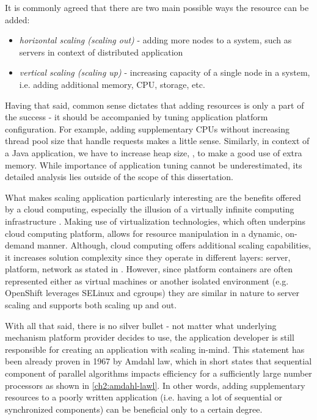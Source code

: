 It is commonly agreed that there are two main possible ways the resource can be added:
\begin{itemize}
	\item \textit{horizontal scaling (scaling out)} - adding more nodes to a system, such as servers in context of distributed application
	\item \textit{vertical scaling (scaling up)} - increasing capacity of a single node in a system, i.e. adding additional memory, CPU, storage, etc.
\end{itemize}

Having that said, common sense dictates that adding resources is only a part of the success - it should be accompanied by tuning application platform configuration. For example, adding supplementary CPUs without increasing thread pool size that handle requests makes a little sense. Similarly, in context of a Java application, we have to increase heap size, , to make a good use of extra memory. While importance of application tuning cannot be underestimated, its detailed analysis lies outside of the scope of this dissertation.

What makes scaling application particularly interesting are the benefits offered by a cloud computing, especially the illusion of a virtually infinite computing infrastructure \cite{VaRoBu11}. Making use of virtualization technologies, which often underpins cloud computing platform, allows for resource manipulation in a dynamic, on-demand manner. Although, cloud computing offers additional scaling capabilities, it increases solution complexity since they operate in different layers: server, platform, network as stated in \cite{VaRoBu11}. However, since platform containers are often represented either as virtual machines or another isolated environment (e.g. OpenShift leverages SELinux and cgroups) they are similar in nature to server scaling and supports both scaling up and out.

With all that said, there is no silver bullet - not matter what underlying mechanism platform provider decides to use, the application developer is still responsible for creating an application with scaling in-mind. This statement has been already proven in 1967 by Amdahl law, which in short states that sequential component of parallel algorithms impacts efficiency for a sufficiently large number processors \cite{Am67} as shown in \ref{ch2:amdahl-lawl}. In other words, adding supplementary resources to a poorly written application (i.e. having a lot of sequential or synchronized components) can be beneficial only to a certain degree.

